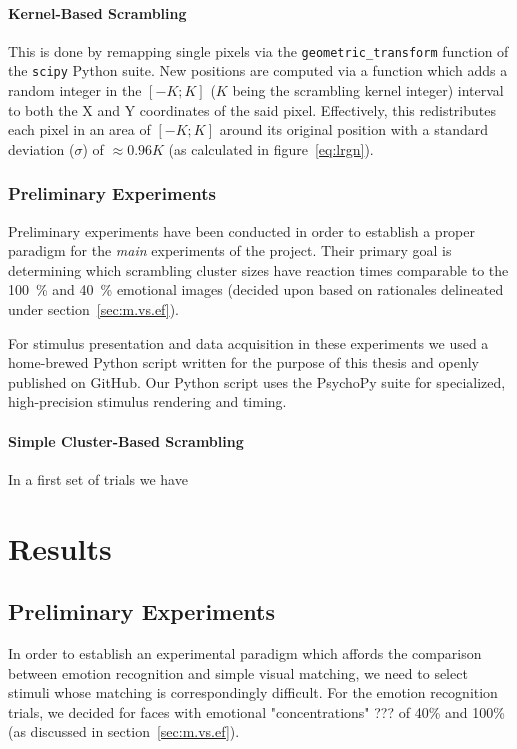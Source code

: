 	    \subsubsection{Kernel-Based Scrambling}\label{sec:m.vs.si.kbs}
	    This is done by remapping single pixels via the \colorbox{vlg}{\texttt{geometric\_transform}} function of the \colorbox{vlg}{\texttt{scipy}} Python suite. 
	    New positions are computed via a function which adds a random integer in the $[-K;K]$ ($K$ being the scrambling kernel integer) interval to both the X and Y coordinates of the said pixel.
	    Effectively, this redistributes each pixel in an area of $[-K;K]$ around its original position with a standard deviation ($\sigma$) of $\approx 0.96K$ (as calculated in figure~\ref{eq:lrgn}). 
	\subsection{Preliminary Experiments} 
	Preliminary experiments have been conducted in order to establish a proper paradigm for the \textit{main} experiments of the project. 
	Their primary goal is determining which scrambling cluster sizes have reaction times comparable to the \SI{100}{\percent} and \SI{40}{\percent} emotional images (decided upon based on rationales delineated under section~\ref{sec:m.vs.ef}).
	
	For stimulus presentation and data acquisition in these experiments we used a home-brewed Python script written for the purpose of this thesis and openly published on GitHub.
	Our Python script uses the PsychoPy suite\cite{Peirce2008} for specialized, high-precision stimulus rendering and timing.   
	    \subsubsection{Simple Cluster-Based Scrambling}
	    In a first set of trials we have 
\chapter{Results}
	\section{Preliminary Experiments}\label{sec:r.pe}
	In order to establish an experimental paradigm which affords the comparison between emotion recognition and simple visual matching, we need to select stimuli whose matching is correspondingly difficult.
	For the emotion recognition trials, we decided for faces with emotional "concentrations" ??? of 40\% and 100\% (as discussed in section~\ref{sec:m.vs.ef}).
